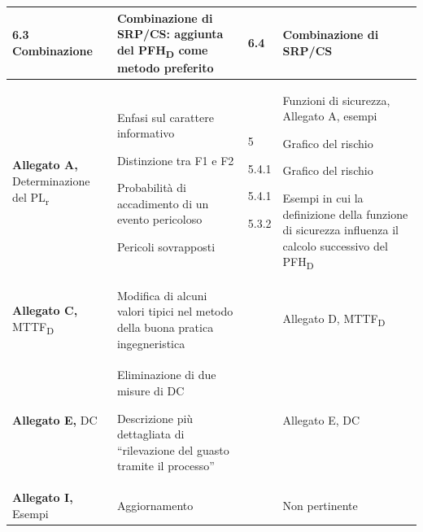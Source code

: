\begin{tabularx}{\textwidth}{|p{2.6cm}|p{7.8cm}|p{1.3cm}X|}
    \textbf{6.3} \newline Combinazione &
    Combinazione di SRP/CS: aggiunta del PFH\textsubscript{D} come metodo preferito &
    6.4 & Combinazione di SRP/CS \\
    \hline
    \rowcolor{black!8}
    \textbf{Allegato A,} \newline Determinazione del PL\textsubscript{\small r} &
    Enfasi sul carattere informativo
    \par\vspace{3pt}
    Distinzione tra F1 e F2
    \par\vspace{3pt}
    Probabilità di accadimento di un evento pericoloso
    \par\vspace{3pt}
    Pericoli sovrapposti &
    5
    \par\vspace{3pt}
    5.4.1
    \par\vspace{3pt}
    5.4.1
    \par\vspace{3pt}
    5.3.2 &
    Funzioni di sicurezza, Allegato A, esempi
    \par\vspace{3pt}
    Grafico del rischio
    \par\vspace{3pt}
    Grafico del rischio
    \par\vspace{3pt}
    Esempi in cui la definizione della funzione di sicurezza influenza il calcolo successivo del PFH\textsubscript{D} \\
    \hline
    \textbf{Allegato C,} \newline MTTF\textsubscript{D} &
    Modifica di alcuni valori tipici nel metodo della buona pratica ingegneristica &
    & Allegato D, MTTF\textsubscript{D} \\
    \hline
    \rowcolor{black!8}
    \textbf{Allegato E,} \newline DC &
    Eliminazione di due misure di DC
    \par\vspace{3pt}
    Descrizione più dettagliata di ``rilevazione del guasto tramite il processo'' &
    & Allegato E, DC \\
    \hline
    \textbf{Allegato I,} \newline Esempi &
    Aggiornamento &
    & Non pertinente \\
    \hline
\end{tabularx}

\endgroup



